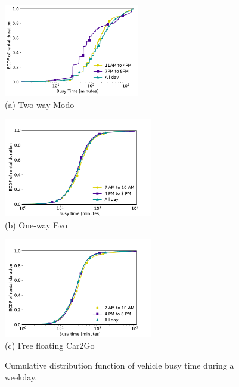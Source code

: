 \begin{figure}[htb]
\centering
    \begin{minipage}[b]{0.45\linewidth}
    \centering
     \includegraphics[width=59mm]{modo_cdfs/modo_tarde_noiteCDF_rebuttal.pdf}
     {\\(a) Two-way Modo}
    \end{minipage}
    \hspace{5mm}
    \begin{minipage}[b]{0.45\linewidth}
     \centering
     \includegraphics[width=65mm]{evo_cdfs/evo_tarde_noiteCDF_rebuttal.pdf}
     \vspace*{-3mm}
     {\\(b) One-way Evo}
    \end{minipage}
    \begin{minipage}[b]{0.45\linewidth}
    \vspace{5mm}
     \centering
     \includegraphics[width=65mm]{car2go_cdfs/c2g_tarde_noiteCDF_rebuttal.pdf}
     {\\(c) Free floating Car2Go}
    \end{minipage}
    \caption{Cumulative distribution function of vehicle busy time during a weekday.}
    \label{fig:4_4_cdfs_picos}
\end{figure}

